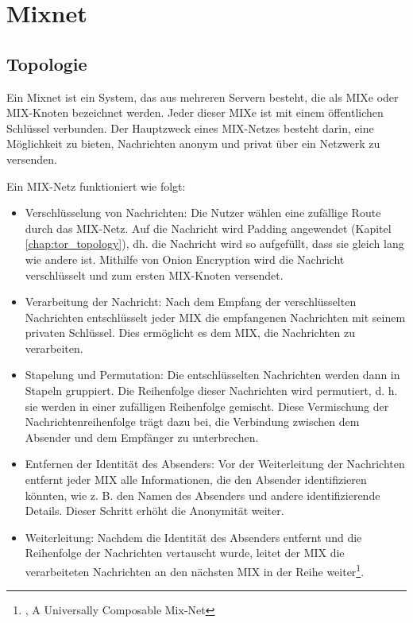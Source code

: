 \section{Mixnet}
\label{chap:mixnet}

\subsection{Topologie}
\label{chap:mixnet_topology}

Ein Mixnet ist ein System, das aus mehreren Servern besteht, die als MIXe oder MIX-Knoten bezeichnet werden. Jeder dieser MIXe ist mit einem öffentlichen Schlüssel verbunden. Der Hauptzweck eines MIX-Netzes besteht darin, eine Möglichkeit zu bieten, Nachrichten anonym und privat über ein Netzwerk zu versenden.

Ein MIX-Netz funktioniert wie folgt:

\begin{itemize}
    \item Verschlüsselung von Nachrichten: Die Nutzer wählen eine zufällige Route durch das MIX-Netz. Auf die Nachricht wird Padding angewendet (Kapitel \ref{chap:tor_topology}), dh. die Nachricht wird so aufgefüllt, dass sie gleich lang wie andere ist. Mithilfe von Onion Encryption wird die Nachricht verschlüsselt und zum ersten MIX-Knoten versendet.
    \item Verarbeitung der Nachricht: Nach dem Empfang der verschlüsselten Nachrichten entschlüsselt jeder MIX die empfangenen Nachrichten mit seinem privaten Schlüssel. Dies ermöglicht es dem MIX, die Nachrichten zu verarbeiten.
    \item Stapelung und Permutation: Die entschlüsselten Nachrichten werden dann in Stapeln gruppiert. Die Reihenfolge dieser Nachrichten wird permutiert, d. h. sie werden in einer zufälligen Reihenfolge gemischt. Diese Vermischung der Nachrichtenreihenfolge trägt dazu bei, die Verbindung zwischen dem Absender und dem Empfänger zu unterbrechen.
    \item Entfernen der Identität des Absenders: Vor der Weiterleitung der Nachrichten entfernt jeder MIX alle Informationen, die den Absender identifizieren könnten, wie z. B. den Namen des Absenders und andere identifizierende Details. Dieser Schritt erhöht die Anonymität weiter.
    \item Weiterleitung: Nachdem die Identität des Absenders entfernt und die Reihenfolge der Nachrichten vertauscht wurde, leitet der MIX die verarbeiteten Nachrichten an den nächsten MIX in der Reihe weiter\footnote{\cite{ComposableMixNet}, A Universally Composable Mix-Net}.
\end{itemize}

